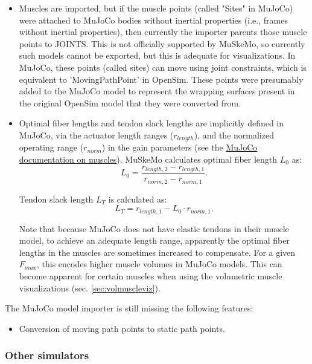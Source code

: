 \documentclass{article}
\begin{document}
\begin{itemize}
\item Muscles are imported, but if the muscle points (called "Sites" in MuJoCo) were attached to MuJoCo bodies without inertial properties (i.e., frames without inertial properties), then currently the importer parents those muscle points to JOINTS. This is not officially supported by MuSkeMo, so currently such models cannot be exported, but this is adequate for visualizations. In MuJoCo, these points (called sites) can move using joint constraints, which is equivalent to 'MovingPathPoint' in OpenSim. These points were presumably added to the MuJoCo model to represent the wrapping surfaces present in the original OpenSim model that they were converted from.
\item Optimal fiber lengths and tendon slack lengths are implicitly defined in MuJoCo, via the actuator length ranges ($r_{length}$), and the normalized operating range ($r_{norm}$) in the gain parameters (see the \href{https://mujoco.readthedocs.io/en/stable/modeling.html#cmuscle}{MuJoCo documentation on muscles}). MuSkeMo calculates optimal fiber length $L_0$ as:
\begin{equation}
L_0 = \frac{r_{length,2} - r_{length,1}}{r_{norm,2} - r_{norm,1}}.
\end{equation}

Tendon slack length $L_T$ is calculated as:
\begin{equation}
L_T = r_{length,1} - L_0 \cdot r_{norm,1}.
\end{equation}

Note that because MuJoCo does not have elastic tendons in their muscle model, to achieve an adequate length range, apparently the optimal fiber lengths in the muscles are sometimes increased to compensate. For a given $F_{max}$, this encodes higher muscle volumes in MuJoCo models. This can become apparent for certain muscles when using the volumetric muscle visualizations (sec. \ref{sec:volmuscleviz}).

\end{itemize}

The MuJoCo model importer is still missing the following features: 

\begin{itemize}
\item Conversion of moving path points to static path points.
\end{itemize}


\subsubsection{Other simulators}
\end{document}
